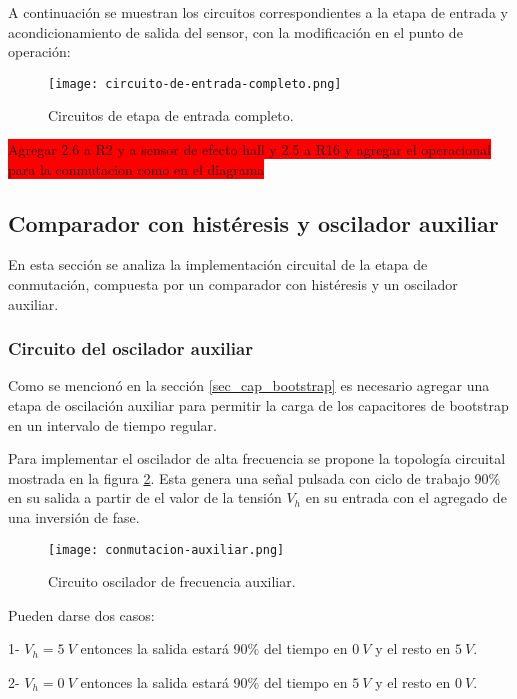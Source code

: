A continuación se muestran los circuitos correspondientes a la etapa de entrada y acondicionamiento de salida del sensor, con la modificación en el punto de operación:

\begin{figure}[H]
	\centering
	\texttt{[image: circuito-de-entrada-completo.png]}
	\caption{Circuitos de etapa de entrada completo.}
	\label{fig:img_circuito-de-entrada-completo.png}
\end{figure}

\colorbox{red}{Agregar 2.6 a R2 y a sensor de efecto hall y 2.5 a R16 y agregar el operacional para la conmutacion como en el diagrama}

\subsection{Comparador con histéresis y oscilador auxiliar}

En esta sección se analiza la implementación circuital de la etapa de conmutación, compuesta por un comparador con histéresis y un oscilador auxiliar.

\subsubsection{Circuito del oscilador auxiliar}

Como se mencionó en la sección \ref{sec_cap_bootstrap} es necesario agregar una etapa de oscilación auxiliar para permitir la carga de los capacitores de bootstrap en un intervalo de tiempo regular.

Para implementar el oscilador de alta frecuencia se propone la topología circuital mostrada en la figura \ref{fig:img_frecuencia-auxiliar}. Esta genera una señal pulsada con ciclo de trabajo 90\% en su salida a partir de el valor de la tensión $V_h$ en su entrada con el agregado de una inversión de fase. 

\begin{figure}[H]
	\centering
	\texttt{[image: conmutacion-auxiliar.png]}
	\caption{Circuito oscilador de frecuencia auxiliar.}
	\label{fig:img_frecuencia-auxiliar}
\end{figure}

Pueden darse dos casos:

1- $V_h=5\:V$ entonces la salida estará 90\% del tiempo en $0\:V$ y  el resto en $5\:V$. 

2- $V_h=0\:V$ entonces la salida estará 90\% del tiempo en $5\:V$ y el resto en $0\:V$.

